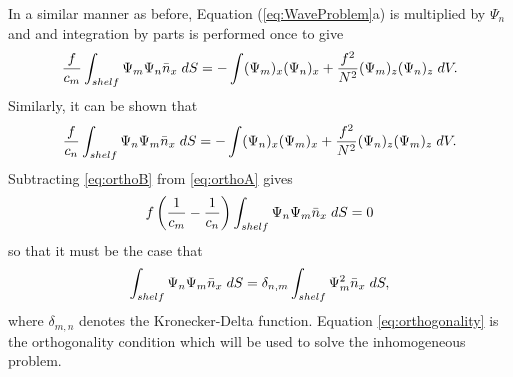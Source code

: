 \documentclass[12pt]{workjournal}
\begin{document}
In a similar manner as before, Equation (\ref{eq:WaveProblem}a) is multiplied by $\Psi_n$ and and integration by parts is performed once to give
\begin{equation}
\frac{f}{c_m}\int_{shelf}\Psi_m \Psi_n \bar{n}_x \hspace{1mm} dS = -\int (\Psi_m)_x (\Psi_n)_x + \frac{f^2}{N^2}(\Psi_m)_z (\Psi_n)_z \hspace{1mm} dV. \label{eq:orthoA}
\end{equation}
Similarly, it can be shown that
\begin{equation}
\frac{f}{c_n}\int_{shelf}\Psi_n \Psi_m \bar{n}_x \hspace{1mm} dS = -\int (\Psi_n)_x (\Psi_m)_x + \frac{f^2}{N^2}(\Psi_n)_z (\Psi_m)_z \hspace{1mm} dV. \label{eq:orthoB}
\end{equation}
Subtracting \eqref{eq:orthoB} from \eqref{eq:orthoA} gives 
\begin{equation}
f \left( \frac{1}{c_m}-\frac{1}{c_n} \right)\int_{shelf}\Psi_n \Psi_m \bar{n}_x \hspace{1mm} dS = 0
\end{equation} 
so that it must be the case that
\begin{equation}
\int_{shelf}\Psi_n \Psi_m \bar{n}_x \hspace{1mm} dS = \delta_{n,m} \int_{shelf} \Psi_m^2 \bar{n}_x \hspace{1mm} dS ,\label{eq:orthogonality}
\end{equation}
where $\delta_{m,n}$ denotes the Kronecker-Delta function. Equation \eqref{eq:orthogonality} is the orthogonality condition which will be used to solve the inhomogeneous problem.
\end{document}
